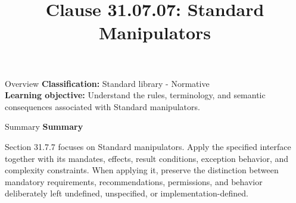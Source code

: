 \documentclass[10pt,letterpaper]{article}
\title{Clause 31.07.07: Standard Manipulators}
\author{}
\date{}
\begin{document}
\maketitle
\begin{CornellOverviewBox}{Overview}
\textbf{Classification:} Standard library - Normative\\[2pt]
\textbf{Learning objective:} Understand the rules, terminology, and semantic consequences associated with Standard manipulators.
\end{CornellOverviewBox}\begin{CornellSummaryBox}{Summary}
{\sffamily\bfseries\color{Accent} Summary}\par\vspace{3pt}Section 31.7.7 focuses on Standard manipulators. Apply the specified interface together with its mandates, effects, result conditions, exception behavior, and complexity constraints. When applying it, preserve the distinction between mandatory requirements, recommendations, permissions, and behavior deliberately left undefined, unspecified, or implementation-defined.
\end{CornellSummaryBox}
\end{document}
